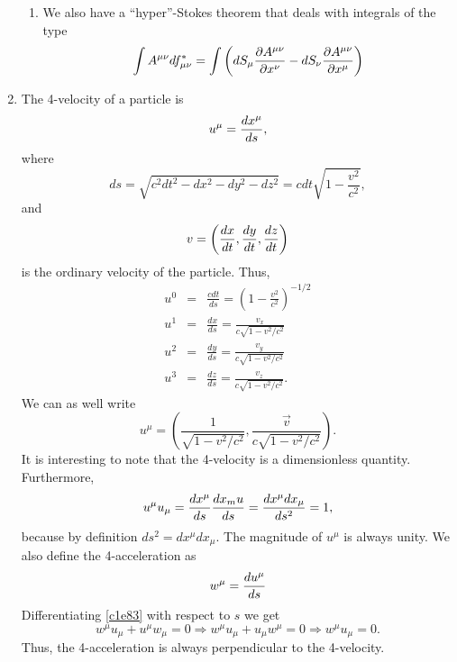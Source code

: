 \begin{enumerate}
\begin{enumerate}
\item We also have a ``hyper''-Stokes theorem that deals with integrals of the 
type
\begin{equation}\label{c1e77}
\int A^{\mu\nu}df^\ast_{\mu\nu} = \int\left(dS_\mu\frac{\partial{A^{\mu\nu}}}{\partial{x^\nu}} - dS_\nu\frac{\partial{A^{\mu\nu}}}{\partial{x^\mu}}\right)
\end{equation}
\end{enumerate}

\item The 4-velocity of a particle is
\begin{equation}\label{c1e78}
u^\mu = \frac{d{x^\mu}}{d{s}},
\end{equation}
where
\[
ds = \sqrt{c^2dt^2 - dx^2 - dy^2 - dz^2} = cdt\sqrt{1 - \frac{v^2}{c^2}},
\]
and
\[
v = \left(\frac{d{x}}{d{t}}, \frac{d{y}}{d{t}}, \frac{d{z}}{d{t}}\right)
\]
is the ordinary velocity of the particle. Thus,
\begin{eqnarray}
u^0 &=& \frac{cdt}{ds} = \left(1 - \frac{v^2}{c^2}\right)^{-1/2} \label{c1e79} \\
u^1 &=& \frac{dx}{ds} = \frac{v_x}{c\sqrt{1 - v^2/c^2}} \label{c1e80} \\
u^2 &=& \frac{dy}{ds} = \frac{v_y}{c\sqrt{1 - v^2/c^2}} \label{c1e81} \\
u^3 &=& \frac{dz}{ds} = \frac{v_z}{c\sqrt{1 - v^2/c^2}}. \label{c1e82}
\end{eqnarray}
We can as well write
\begin{equation}\label{c1e83}
u^\mu = \left(\frac{1}{\sqrt{1 - v^2/c^2}}, \frac{\vec{v}}{c\sqrt{1 - v^2/c^2}}\right).
\end{equation}
It is interesting to note that the 4-velocity is a dimensionless quantity. Furthermore,
\begin{equation}\label{c1e84}
u^\mu u_\mu = \frac{d{x^\mu}}{d{s}}\frac{d{x_mu}}{d{s}} = \frac{dx^\mu dx_\mu}{ds^2} = 1,
\end{equation}
because by definition $ds^2 = dx^\mu dx_\mu$. The magnitude of $u^\mu$ is always
unity. We also define the 4-acceleration as
\begin{equation}\label{c1e85}
w^\mu = \frac{d{u^\mu}}{d{s}}
\end{equation}
Differentiating \eqref{c1e83} with respect to $s$ we get
\begin{equation}\label{c1e86}
w^\mu u_\mu + u^\mu w_\mu = 0 \Rightarrow w^\mu u_\mu + u_\mu w^\mu = 0 \Rightarrow w^\mu u_\mu = 0.
\end{equation}
Thus, the 4-acceleration is always perpendicular to the 4-velocity.
\end{enumerate}

